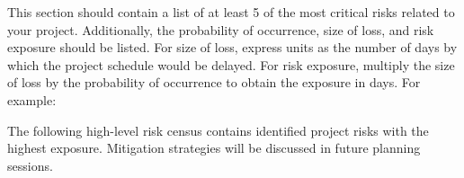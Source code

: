 This section should contain a list of at least 5 of the most critical risks related to your project. Additionally, the probability of occurrence, size of loss, and risk exposure should be listed. For size of loss, express units as the number of days by which the project schedule would be delayed. For risk exposure, multiply the size of loss by the probability of occurrence to obtain the exposure in days. For example:

The following high-level risk census contains identified project risks with the highest exposure. Mitigation strategies will be discussed in future planning sessions.

\begin{table}[h]
\caption{Overview of highest exposure project risks} 
\end{table}